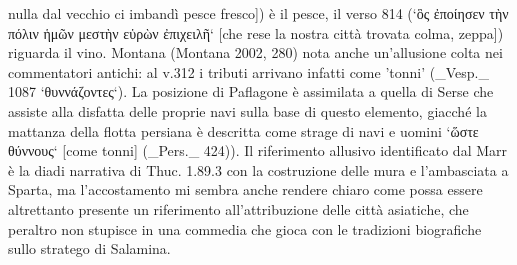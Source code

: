 {nulla dal vecchio ci imbandì pesce fresco]) è il pesce, il verso 814 (`ὃς ἐποίησεν τὴν πόλιν ἡμῶν μεστὴν εὑρὼν ἐπιχειλῆ` [che rese la nostra città trovata colma, zeppa]) riguarda il vino. Montana (Montana 2002, 280) nota anche un'allusione colta nei commentatori antichi: al v.312 i tributi arrivano infatti come 'tonni' (_Vesp._ 1087 `θυννάζοντες`). La posizione di Paflagone è assimilata a quella di Serse che assiste alla disfatta delle proprie navi sulla base di questo elemento, giacché la mattanza della flotta persiana è descritta come strage di navi e uomini `ὥστε θύννους` [come tonni] (_Pers._ 424)). Il riferimento allusivo identificato dal Marr è la diadi narrativa di Thuc. 1.89.3 con la costruzione delle mura e l'ambasciata a Sparta, ma l'accostamento mi sembra anche rendere chiaro come  possa essere altrettanto presente un riferimento all'attribuzione delle città asiatiche, che peraltro non stupisce in una commedia che gioca con le tradizioni biografiche sullo stratego di Salamina.
}
